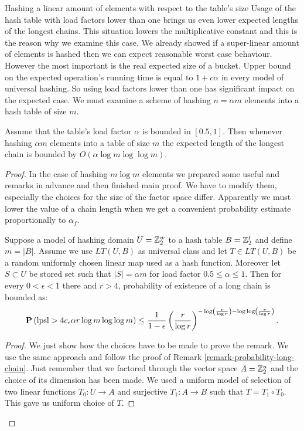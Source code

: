 \begin{section}{Hashing a linear amount of elements with respect to the table's size}
Usage of the hash table with load factors lower than one brings us even lower expected lengths of the longest chains. This situation lowers the multiplicative constant and this is the reason why we examine this case. We already showed if a super-linear amount of elements is hashed then we can expect reasonable worst case behaviour. However the most important is the real expected size of a bucket. Upper bound on the expected operation's running time is equal to $1 + c \alpha$ in every model of universal hashing. So using load factors lower than one has significant impact on the expected case. We must examine a scheme of hashing $n = \alpha m$ elements into a hash table of size $m$. 

\begin{theorem}
\label{theorem-n-to-n}
Assume that the table's load factor $\alpha$ is bounded in $\left[0.5, 1\right]$. Then whenever hashing $\alpha m$ elements into a table of size $m$ the expected length of the longest chain is bounded by $O(\alpha \log m \log \log m)$.
\end{theorem}
\begin{proof}

In the case of hashing $m \log m$ elements we prepared some useful and remarks in advance and then finished main proof. We have to modify them, especially the choices for the size of the factor space differ. Apparently we must lower the value of a chain length when we get a convenient probability estimate proportionally to $\alpha_f$. 

\begin{remark}
Suppose a model of hashing domain $U = \mathbb{Z}_{2}^{w}$ to a hash table $B = \mathbb{Z}_{2}^{t}$ and define $m = |B|$. Assume we use $LT(U, B)$ as universal class and let $T \in LT(U, B)$ be a random uniformly chosen linear map used as a hash function. Moreover let $S \subset U$ be stored set such that $|S| = \alpha m$ for load factor $0.5 \leq \alpha \leq 1$. Then for every $0 < \epsilon < 1$ there and $r > 4$,  probability of existence of a long chain is bounded as:
\[
\mathbf{P}\left(\mathrm{lpsl} > 4 c_\epsilon \alpha r \log m \log \log m\right) \leq \frac{1}{1 - \epsilon} \left(\frac{r}{\log r}\right)^{-\log \left(\frac{r}{\log r}\right) - \log \log \left(\frac{r}{\log r}\right)} \text{.}
\]
\end{remark}
\begin{proof}
We just show how the choices have to be made to prove the remark. We use the same approach and follow the proof of Remark \ref{remark-probability-long-chain}. Just remember that we factored through the vector space $A = \mathbb{Z}_{2}^{u}$ and the choice of its dimension has been made. We used a uniform model of selection of two linear functions $T_0: U \rightarrow A$ and surjective $T_1: A \rightarrow B$ such that $T = T_1 \circ T_0$. This gave us uniform choice of $T$.


\end{proof}
\end{proof}
\end{section}
